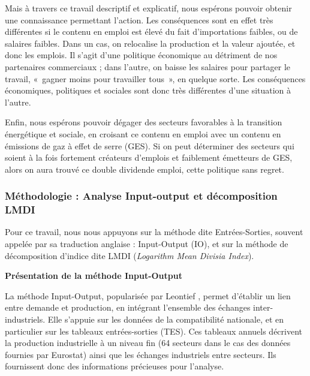 Mais à travers ce travail descriptif et explicatif, nous espérons pouvoir obtenir une connaissance permettant l’action. Les conséquences sont en effet très différentes si le contenu en emploi est élevé du fait d’importations faibles, ou de salaires faibles. Dans un cas, on relocalise la production et la valeur ajoutée, et donc les emplois. Il s’agit d’une politique économique au détriment de nos partenaires commerciaux ; dans l’autre, on baisse les salaires pour partager le travail, «~gagner moins pour travailler tous~», en quelque sorte. Les conséquences économiques, politiques et sociales sont donc très différentes d’une situation à l’autre.

Enfin, nous espérons pouvoir dégager des secteurs favorables à la transition énergétique et sociale, en croisant ce contenu en emploi avec un contenu en émissions de gaz à effet de serre (GES). Si on peut déterminer des secteurs qui soient à la fois fortement créateurs d’emplois et faiblement émetteurs de GES, alors on aura trouvé ce double dividende emploi, cette politique sans regret. 


\subsubsection{Méthodologie : Analyse Input-output et décomposition LMDI}

Pour ce travail, nous nous appuyons sur la méthode dite Entrées-Sorties, souvent appelée par sa traduction anglaise : Input-Output (IO), et sur la méthode de décomposition d'indice dite LMDI (\textit{Logarithm Mean Divisia Index}).

\vspace{1em}
\textbf{Présentation de la méthode Input-Output}

La méthode Input-Output, popularisée par Leontief \citep{Leontief1941}, permet d'établir un lien entre demande et production, en intégrant l'ensemble des échanges inter-industriels.
Elle s'appuie sur les données de la compatibilité nationale, et en particulier sur les tableaux entrées-sorties (TES). Ces tableaux annuels décrivent la production industrielle à un niveau fin (64 secteurs dans le cas des données fournies par Eurostat) ainsi que les échanges industriels entre secteurs. Ils fournissent donc des informations précieuses pour l'analyse.

